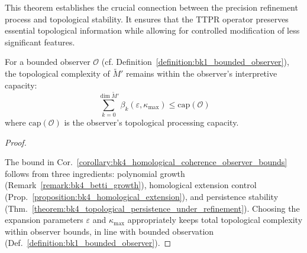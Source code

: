 This theorem establishes the crucial connection between the precision refinement process and topological stability. It ensures that the TTPR operator preserves essential topological information while allowing for controlled modification of less significant features.

\begin{corollary}
\label{corollary:bk4_homological_coherence_observer_bounds}
For a bounded observer $\mathcal{O}$ (cf. Definition~\ref{definition:bk1_bounded_observer}), the topological complexity of $\widetilde{M}'$ remains within the observer's interpretive capacity:
\[
\sum_{k=0}^{\dim \widetilde{M}'} \beta_k(\varepsilon, \kappa_{\max}) \leq \text{cap}(\mathcal{O})
\]
where $\text{cap}(\mathcal{O})$ is the observer's topological processing capacity.
\end{corollary}

\begin{proof}
\label{proof:bk4_observer_capacity_bound}
\leavevmode

The bound in Cor.~\ref{corollary:bk4_homological_coherence_observer_bounds}
follows from three ingredients: polynomial growth
(Remark~\ref{remark:bk4_betti_growth}), homological extension control
(Prop.~\ref{proposition:bk4_homological_extension}), and persistence stability
(Thm.~\ref{theorem:bk4_topological_persistence_under_refinement}).
Choosing the expansion parameters $\varepsilon$ and $\kappa_{\max}$
appropriately keeps total topological complexity within observer bounds, in
line with bounded observation (Def.~\ref{definition:bk1_bounded_observer}).
\end{proof}

